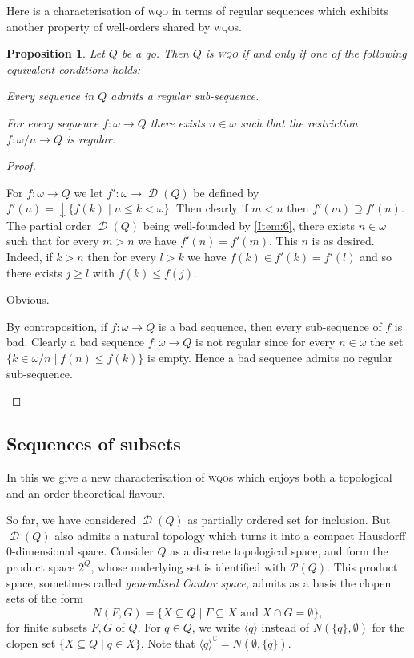 \documentclass{article}%
\theoremstyle{plain}
\newtheorem{proposition}[theorem]{Proposition}
\theoremstyle{definition}
\theoremstyle{remark}
\newcommand{\wqo}{\textsc{wqo}}
\DeclareMathOperator{\dcl}{\downarrow}
\DeclareMathOperator{\Down}{\mathcal{D}} %
\newcommand{\ClUp}[1] {\langle #1\rangle}
\begin{document}
Here is a characterisation of \wqo{} in terms of regular sequences which exhibits another property of well-orders shared by \wqo{}s.
\begin{proposition}\label{prop: RegSubseq}
Let $Q$ be a qo. Then $Q$ is \wqo{} if and only if one of the following equivalent conditions holds:
\begin{enumWqo}[Wqo]
\item \label{Item:9}Every sequence in $Q$ admits a regular sub-sequence.
\item \label{Item:10}For every sequence $f:\omega\to Q$ there exists $n\in\omega$ such that the restriction $f:\omega/n\to Q$ is regular.
\end{enumWqo}
\end{proposition}
\begin{proof}
\begin{descProofUp}
\item [\cref{Item:6}$\to$\cref{Item:10}] For $f:\omega\to Q$ we let $f':\omega\to \Down(Q)$ be defined by $f'(n)=\dcl\{f(k)\mid n\leq k<\omega\}$. Then clearly if $m<n$ then $f'(m)\supseteq f'(n)$. The partial order $\Down(Q)$ being well-founded by \cref{Item:6}, there exists $n\in\omega$ such that for every $m>n$ we have $f'(n)=f'(m)$. This $n$ is as desired. Indeed, if $k>n$ then for every $l>k$ we have $f(k)\in f'(k)=f'(l)$ and so there exists $j\geq l$ with $f(k)\leq f(j)$. 

\item [\cref{Item:10}$\to$\cref{Item:9}] Obvious.


\item[\cref{Item:9}$\to$\cref{Item:2}] By contraposition, if $f:\omega\to Q$ is a bad sequence, then every sub-sequence of $f$ is bad. Clearly a bad sequence $f:\omega\to Q$ is not regular since for every $n\in\omega$ the set $\{k\in\omega/n\mid f(n)\leq f(k)\}$ is empty. Hence a bad sequence admits no regular sub-sequence. \qedhere
\end{descProofUp}
\end{proof}

\subsection{Sequences of subsets}\label{subsec SeqOfSubsets}

In this  we give a new characterisation of \wqo{}s which enjoys both a topological and an order-theoretical flavour. 

So far, we have considered $\Down(Q)$ as partially ordered set for inclusion. But $\Down(Q)$ also admits a natural topology which turns it into a compact Hausdorff $0$-dimensional space. Consider $Q$ as a discrete topological space, and form the product space $2^{Q}$, whose underlying set is identified with $\mathcal{P}(Q)$. This product space, sometimes called \emph{generalised Cantor space}, admits as a basis the clopen sets of the form
\[
N(F,G)=\{X\subseteq Q\mid F\subseteq X \text{ and } X\cap G=\emptyset\}, 
\]
for finite subsets $F,G$ of $Q$. For $q\in Q$, we write $\ClUp{q}$ instead of $N(\{q\},\emptyset)$ for the clopen set $\{X\subseteq Q\mid q\in X\}$.  Note that $\ClUp{q}^{\complement}=N(\emptyset,\{q\})$.
\end{document}
